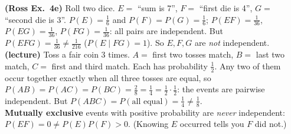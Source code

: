 \documentclass[11pt]{article}
\begin{document}
\begin{warnbox}
\textbf{(Ross Ex.\ 4e)} Roll two dice. $E=$ ``sum is 7'', $F=$ ``first die is 4'', $G=$ ``second die is 3''. $P(E)=\tfrac16$ and $P(F)=P(G)=\tfrac16$; $P(EF)=\tfrac1{36}$, $P(EG)=\tfrac1{36}$, $P(FG)=\tfrac1{36}$: all pairs are independent. But $P(EFG)=\tfrac1{36}\ne\tfrac1{216}$ ($P(E\mid FG)=1$). So $E,F,G$ are \emph{not} independent.\\
\textbf{(lecture)} Toss a fair coin 3 times. $A=$ first two tosses match, $B=$ last two match, $C=$ first and third match. Each has probability $\tfrac12$. Any two of them occur together exactly when all three tosses are equal, so $P(AB)=P(AC)=P(BC)=\tfrac28=\tfrac14=\tfrac12\cdot\tfrac12$: the events are pairwise independent. But $P(ABC)=P(\text{all equal})=\tfrac14\ne\tfrac18$.\\
\textbf{Mutually exclusive} events with positive probability are \emph{never} independent: $P(EF)=0\ne P(E)P(F)>0$. (Knowing $E$ occurred tells you $F$ did not.)
\end{warnbox}
\end{document}
